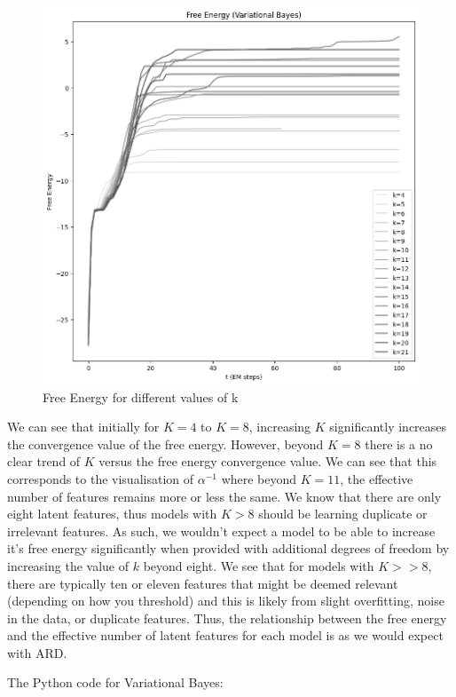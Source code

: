 \documentclass[12pt]{article}
\begin{document}
{\begin{figure}[h]
\centering
\includegraphics[scale=0.4]{outputs/q4/b-free-energy}
\caption{Free Energy for different values of k}
\label{fig:}
\end{figure}

We can see that initially for $K=4$ to $K=8$, increasing $K$ significantly increases the convergence value of the free energy. However, beyond $K=8$ there is a no clear trend of $K$ versus the free energy convergence value. We can see that this corresponds to the visualisation of $\alpha^{-1}$ where beyond $K=11$, the effective number of features remains more or less the same. We know that there are only eight latent features, thus models with $K>8$ should be learning duplicate or irrelevant features. As such, we wouldn't expect a model to be able to increase it's free energy significantly when provided with additional degrees of freedom by increasing the value of $k$ beyond eight. We see that for models with $K>>8$, there are typically ten or eleven features that might be deemed relevant (depending on how you threshold) and this is likely from slight overfitting, noise in the data, or duplicate features. Thus, the relationship between the free energy and the effective number of latent features for each model is as we would expect with ARD.


\newpage
The Python code for Variational Bayes:


}
\end{document}
